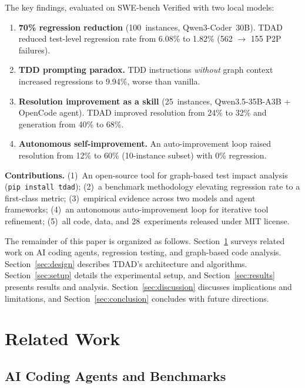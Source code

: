 \documentclass[sigconf,nonacm]{acmart}
\begin{document}
The key findings, evaluated on SWE-bench Verified with two local models:

\begin{enumerate}
  \item \textbf{70\% regression reduction} (100~instances, Qwen3-Coder~30B).
    \textsc{TDAD} reduced test-level regression rate from
    6.08\% to 1.82\% (562 $\to$ 155 P2P failures).
  \item \textbf{TDD prompting paradox.}  TDD instructions \emph{without}
    graph context increased regressions to 9.94\%, worse than vanilla.
  \item \textbf{Resolution improvement as a skill} (25~instances,
    Qwen3.5-35B-A3B + OpenCode agent).  \textsc{TDAD} improved resolution
    from 24\% to 32\% and generation from 40\% to 68\%.
  \item \textbf{Autonomous self-improvement.} An auto-improvement loop raised
    resolution from 12\% to 60\% (10-instance subset) with 0\% regression.
\end{enumerate}

\noindent\textbf{Contributions.}\enspace
(1)~An open-source tool for graph-based test impact analysis
(\texttt{pip install tdad});
(2)~a benchmark methodology elevating regression rate to a first-class metric;
(3)~empirical evidence across two models and agent frameworks;
(4)~an autonomous auto-improvement loop for iterative tool refinement;
(5)~all code, data, and 28~experiments released under MIT license.

The remainder of this paper is organized as follows.
Section~\ref{sec:related} surveys related work on AI coding agents,
regression testing, and graph-based code analysis.
Section~\ref{sec:design} describes \textsc{TDAD}'s architecture and
algorithms.  Section~\ref{sec:setup} details the experimental setup, and
Section~\ref{sec:results} presents results and analysis.
Section~\ref{sec:discussion} discusses implications and limitations, and
Section~\ref{sec:conclusion} concludes with future directions.


\section{Related Work}
\label{sec:related}

\subsection{AI Coding Agents and Benchmarks}
\end{document}
